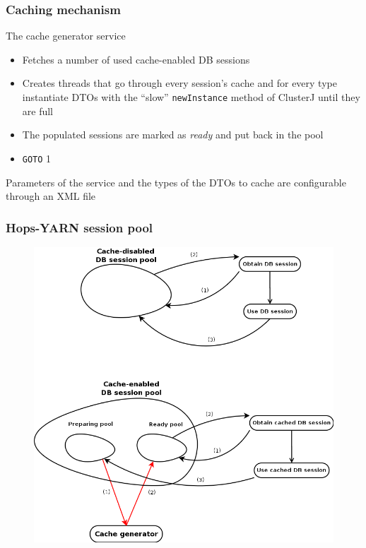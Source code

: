 \documentclass{beamer}
\begin{document}
\begin{frame}
\frametitle{Caching mechanism}

The cache generator service
\begin{itemize}
\item Fetches a number of used cache-enabled DB sessions

\item Creates threads that go through every session's cache and for
  every type instantiate DTOs with the ``slow''
  \texttt{newInstance} method of ClusterJ until they are full

\item The populated sessions are marked as \emph{ready} and put back
  in the pool

\item \texttt{GOTO} 1
\end{itemize}

Parameters of the service and the types of the DTOs to cache are
  configurable through an XML file

\end{frame}


\begin{frame}
\frametitle{Hops-YARN session pool}

\begin{figure}
\centering
\includegraphics[scale=0.2]{resources/db_session_pools.png}
\end{figure}
\end{frame}
\end{document}
